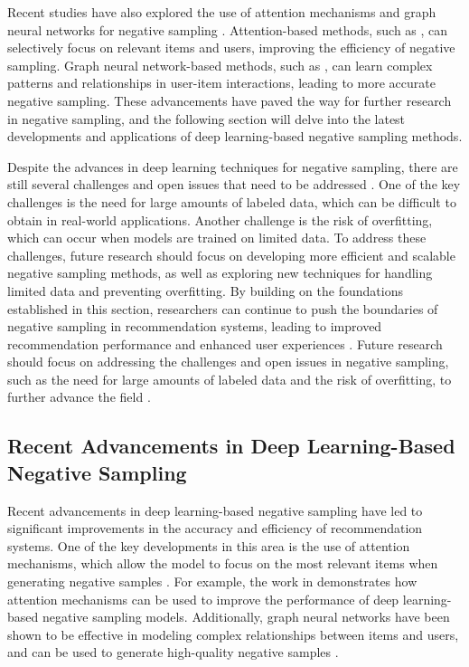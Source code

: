\documentclass[11pt,a4paper]{article}
\begin{document}
Recent studies have also explored the use of attention mechanisms and graph neural networks for negative sampling \cite{arxiv:1707.07435}. Attention-based methods, such as \cite{doi:10.1145/3580305.3599869}, can selectively focus on relevant items and users, improving the efficiency of negative sampling. Graph neural network-based methods, such as \cite{doi:10.1145/3589335.3648312}, can learn complex patterns and relationships in user-item interactions, leading to more accurate negative sampling. These advancements have paved the way for further research in negative sampling, and the following section will delve into the latest developments and applications of deep learning-based negative sampling methods.

Despite the advances in deep learning techniques for negative sampling, there are still several challenges and open issues that need to be addressed \cite{doi:10.1145/3434185}. One of the key challenges is the need for large amounts of labeled data, which can be difficult to obtain in real-world applications. Another challenge is the risk of overfitting, which can occur when models are trained on limited data. To address these challenges, future research should focus on developing more efficient and scalable negative sampling methods, as well as exploring new techniques for handling limited data and preventing overfitting. By building on the foundations established in this section, researchers can continue to push the boundaries of negative sampling in recommendation systems, leading to improved recommendation performance and enhanced user experiences \cite{doi:10.1145/3589334.3648159}. Future research should focus on addressing the challenges and open issues in negative sampling, such as the need for large amounts of labeled data and the risk of overfitting, to further advance the field \cite{doi:10.1145/3728372}.


\subsection{Recent Advancements in Deep Learning-Based Negative Sampling}


Recent advancements in deep learning-based negative sampling have led to significant improvements in the accuracy and efficiency of recommendation systems. One of the key developments in this area is the use of attention mechanisms, which allow the model to focus on the most relevant items when generating negative samples \cite{doi:10.1145/3038912.3052585}. For example, the work in \cite{doi:10.24963/ijcai.2017/446} demonstrates how attention mechanisms can be used to improve the performance of deep learning-based negative sampling models. Additionally, graph neural networks have been shown to be effective in modeling complex relationships between items and users, and can be used to generate high-quality negative samples \cite{doi:10.1609/aaai.v34i04.6094}.
\end{document}
